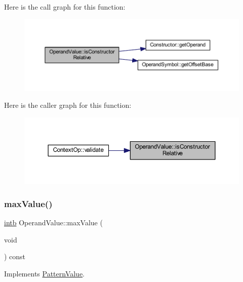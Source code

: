 Here is the call graph for this function\+:
\nopagebreak
\begin{figure}[H]
\begin{center}
\leavevmode
\includegraphics[width=350pt]{class_operand_value_ac5edba5396509e93a2c4b9940189f8e2_cgraph}
\end{center}
\end{figure}
Here is the caller graph for this function\+:
\nopagebreak
\begin{figure}[H]
\begin{center}
\leavevmode
\includegraphics[width=350pt]{class_operand_value_ac5edba5396509e93a2c4b9940189f8e2_icgraph}
\end{center}
\end{figure}
\mbox{\label{class_operand_value_af085d3749d762be4f5e30339c063a009}} 
\subsubsection{\texorpdfstring{maxValue()}{maxValue()}}
{\footnotesize\ttfamily \mbox{\hyperlink{types_8h_aa925ba3e627c2df89d5b1cfe84fb8572}{intb}} Operand\+Value\+::max\+Value (\begin{DoxyParamCaption}\item[{void}]{ }\end{DoxyParamCaption}) const\hspace{0.3cm}{\ttfamily [virtual]}}



Implements \mbox{\hyperlink{class_pattern_value_a865e8f34e031ef31f77dcaa93d76820d}{Pattern\+Value}}.



